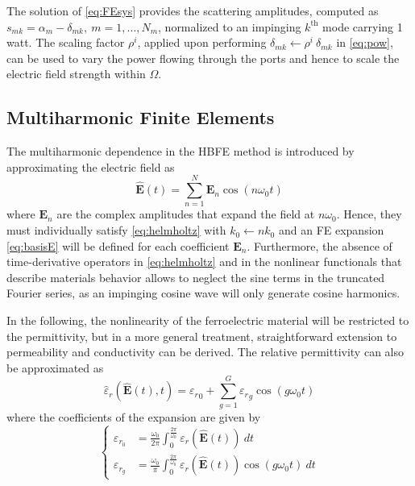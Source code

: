 \documentclass[journal,twoside,letterpaper]{IEEEtran}
\renewcommand{\vec}[1]{\mathbf{#1}}
\begin{document}
The solution of \eqref{eq:FEsys} provides the scattering amplitudes, computed as $s_{mk} = \alpha_{m} - \delta_{mk}, \ m=1,\ldots,N_m$, normalized to an impinging $k^\text{th}$ mode carrying 1 watt. The scaling factor $\rho^i$, applied upon performing $\delta_{mk} \leftarrow \rho^i \ \delta_{mk}$ in \eqref{eq:pow}, can be used to vary the power flowing through the ports and  hence to scale the electric field strength within $\Omega$.

\subsection{Multiharmonic Finite Elements}\label{sec:HBFE}


The multiharmonic dependence in the HBFE method is introduced by approximating the electric field as \cite{Bachinger2005}
%
\begin{equation*} 
\label{eq:field}
\vec{\hat{E}}(t) = \sum_{n=1}^N \vec{E}_{n} \cos (n \omega_0 t)
\end{equation*}
%
\noindent where $\vec{E}_{n}$ are the complex amplitudes that expand the field at $n\omega_0$. Hence, they must individually satisfy \eqref{eq:helmholtz} with $k_0 \leftarrow n k_0$ and an FE expansion \eqref{eq:basisE} will be defined for each coefficient $\vec{E}_{n}$. Furthermore, the absence of time-derivative operators in \eqref{eq:helmholtz} and in the nonlinear functionals that describe materials behavior  allows to neglect the sine terms in the truncated Fourier series, as an impinging cosine wave will only generate cosine harmonics.

In the following, the nonlinearity of the ferroelectric material will be restricted to the permittivity, but in a more general treatment, straightforward extension to permeability \cite{ntibarikure2014harmonic} and conductivity can be derived. The relative permittivity can also be approximated as
%
\begin{equation*} 
\label{eq:eps}
\hat{{\varepsilon}}_r(\hat{\vec{E}}(t), t) =  {\varepsilon_r}_0+  \sum_{g=1}^G {\varepsilon_r}_g \cos ( g \omega_0 t)
\end{equation*} 
\noindent where the coefficients of the expansion are given by
\begin{equation*} 
\label{eq:epsCoeffs}
\left \lbrace
\begin{aligned}
{\varepsilon}_{r_{0}} &=  \frac{\omega_0}{2 \pi}\int_0^{\frac{2\pi}{\omega_0}} {\varepsilon}_r(\hat{\vec{E}}(t)) \ dt \\
{\varepsilon}_{r_{g}} &=  \frac{\omega_0}{\pi}\int_0^{\frac{2\pi}{\omega_0}} {\varepsilon}_r(\hat{\vec{E}}(t)) \cos ( g \omega_0 t) \ dt
\end{aligned}
\right.
\end{equation*}
%
\end{document}
